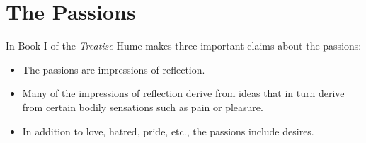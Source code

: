 

\section{The Passions}\label{sec:the_passions} %

In Book I of the \emph{Treatise} Hume makes three important claims about the passions:

\begin{itemize}
    \item The passions are impressions of reflection.
    \item Many of the impressions of reflection derive from ideas that in turn derive from certain bodily sensations such as pain or pleasure.
    \item In addition to love, hatred, pride, etc., the passions include desires.
\end{itemize}

\change


